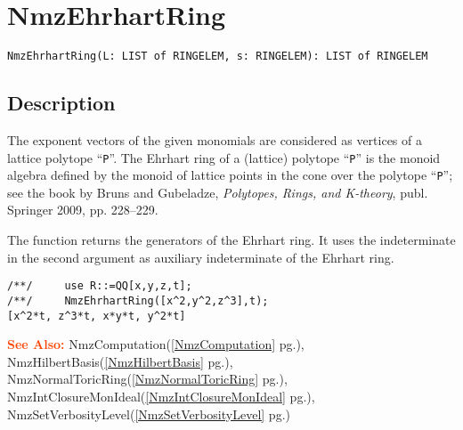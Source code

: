 \documentclass[a4paper]{mybook}
\newenvironment{command}{}{} %
\newcommand\SeeAlso{\par\textcolor{OrangeRed}{\textbf{\large See Also: }}}
\begin{document}
\section{NmzEhrhartRing}
\label{NmzEhrhartRing}
\begin{command} %


\begin{Verbatim}[label=syntax, rulecolor=\color{MidnightBlue},
frame=single]
NmzEhrhartRing(L: LIST of RINGELEM, s: RINGELEM): LIST of RINGELEM
\end{Verbatim}


\subsection*{Description}

The exponent vectors of the given monomials are considered as vertices
of a lattice polytope ``\verb&P&''.  The Ehrhart ring of a (lattice)
polytope ``\verb&P&'' is the monoid algebra defined by the monoid of
lattice points in the cone over the polytope ``\verb&P&''; see the book
by Bruns and Gubeladze, \textit{Polytopes, Rings, and K-theory}, publ.
Springer 2009, pp. 228--229.
\par 
The function returns the generators of the Ehrhart ring.  It uses the
indeterminate in the second argument as auxiliary indeterminate of the
Ehrhart ring.
\begin{Verbatim}[label=example, rulecolor=\color{PineGreen}, frame=single]
/**/     use R::=QQ[x,y,z,t];
/**/     NmzEhrhartRing([x^2,y^2,z^3],t);
[x^2*t, z^3*t, x*y*t, y^2*t]
\end{Verbatim}


\SeeAlso %
  NmzComputation(\ref{NmzComputation} pg.\pageref{NmzComputation}), 
    NmzHilbertBasis(\ref{NmzHilbertBasis} pg.\pageref{NmzHilbertBasis}), 
    NmzNormalToricRing(\ref{NmzNormalToricRing} pg.\pageref{NmzNormalToricRing}), 
    NmzIntClosureMonIdeal(\ref{NmzIntClosureMonIdeal} pg.\pageref{NmzIntClosureMonIdeal}), 
    NmzSetVerbosityLevel(\ref{NmzSetVerbosityLevel} pg.\pageref{NmzSetVerbosityLevel})
\end{command} %
\end{document}

